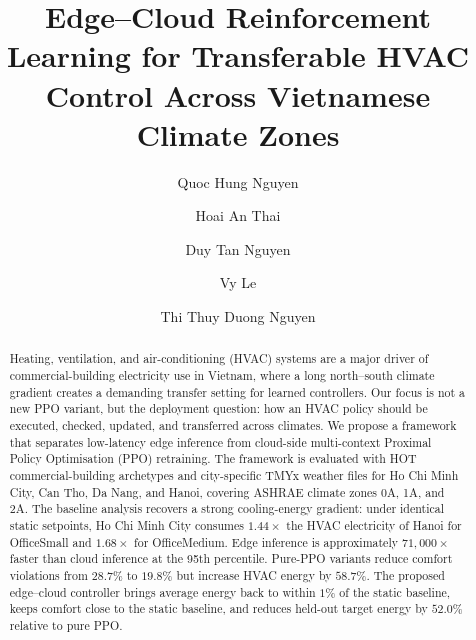 \documentclass[runningheads,a4paper]{llncs}
\begin{document}
\title{Edge--Cloud Reinforcement Learning for Transferable HVAC Control Across Vietnamese Climate Zones}

\author{Quoc Hung Nguyen\and
Hoai An Thai\and
Duy Tan Nguyen\and
Vy Le\and
Thi Thuy Duong Nguyen}


\maketitle

\begin{abstract}
Heating, ventilation, and air-conditioning (HVAC) systems are a major driver of commercial-building electricity use in Vietnam, where a long north--south climate gradient creates a demanding transfer setting for learned controllers. Our focus is not a new PPO variant, but the deployment question: how an HVAC policy should be executed, checked, updated, and transferred across climates. We propose a framework that separates low-latency edge inference from cloud-side multi-context Proximal Policy Optimisation (PPO) retraining. The framework is evaluated with HOT commercial-building archetypes and city-specific TMYx weather files for Ho Chi Minh City, Can Tho, Da Nang, and Hanoi, covering ASHRAE climate zones 0A, 1A, and 2A. The baseline analysis recovers a strong cooling-energy gradient: under identical static setpoints, Ho Chi Minh City consumes $1.44\times$ the HVAC electricity of Hanoi for OfficeSmall and $1.68\times$ for OfficeMedium. Edge inference is approximately $71{,}000\times$ faster than cloud inference at the 95th percentile. Pure-PPO variants reduce comfort violations from $28.7\%$ to $19.8\%$ but increase HVAC energy by $58.7\%$. The proposed edge--cloud controller brings average energy back to within $1\%$ of the static baseline, keeps comfort close to the static baseline, and reduces held-out target energy by $52.0\%$ relative to pure PPO.
\end{abstract}
\end{document}
